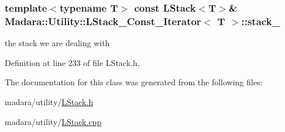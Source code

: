 \hypertarget{classMadara_1_1Utility_1_1LStack__Const__Iterator_a7894cd9a3d63031443f60c0e227b853a}{
\subsubsection[{stack\_\-}]{\setlength{\rightskip}{0pt plus 5cm}template$<$typename T$>$ const {\bf LStack}$<$T$>$\& {\bf Madara::Utility::LStack\_\-Const\_\-Iterator}$<$ T $>$::{\bf stack\_\-}}}
\label{de/de3/classMadara_1_1Utility_1_1LStack__Const__Iterator_a7894cd9a3d63031443f60c0e227b853a}


the stack we are dealing with 



Definition at line 233 of file LStack.h.



The documentation for this class was generated from the following files:\begin{DoxyCompactItemize}
\item 
madara/utility/\hyperlink{LStack_8h}{LStack.h}\item 
madara/utility/\hyperlink{LStack_8cpp}{LStack.cpp}\end{DoxyCompactItemize}
